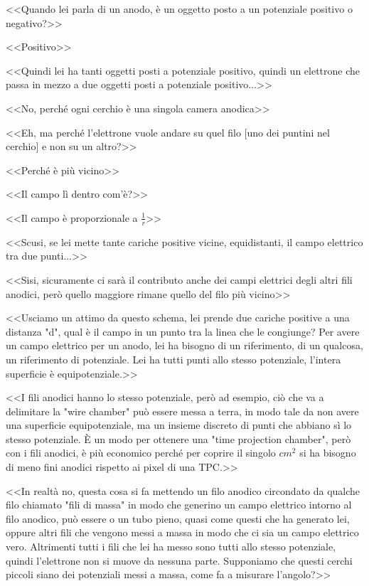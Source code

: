 \documentclass[../main.tex]{subfiles}
\begin{document}
\begin{enumerate}
{\begin{flushright}
    \end{flushright}
    <<Quando lei parla di un anodo, è un oggetto posto a un potenziale positivo o negativo?>>
    \begin{flushright}
    <<Positivo>>
    \end{flushright}
    <<Quindi lei ha tanti oggetti posti a potenziale positivo,  quindi un elettrone che passa in mezzo a due oggetti posti a potenziale positivo...>>
    \begin{flushright}
    <<No, perché ogni cerchio è una singola camera anodica>>
    \end{flushright}
    <<Eh, ma perché l'elettrone vuole andare su quel filo [uno dei puntini nel cerchio] e non su un altro?>>
    \begin{flushright}
    <<Perché è più vicino>>
    \end{flushright}
    <<Il campo lì dentro com'è?>>
    \begin{flushright}
    <<Il campo è proporzionale a $\frac{1}{r}$>>
    \end{flushright}
    <<Scusi, se lei mette tante cariche positive vicine, equidistanti, il campo elettrico tra due punti...>>
    \begin{flushright}
    <<Sisi, sicuramente ci sarà il contributo anche dei campi elettrici degli altri fili anodici, però quello maggiore rimane quello del filo più vicino>>
    \end{flushright}
    <<Usciamo un attimo da questo schema, lei prende due cariche positive a una distanza "d", qual è il campo in un punto tra la linea che le congiunge? Per avere un campo elettrico per un anodo, lei ha bisogno di un riferimento, di un qualcosa, un riferimento di potenziale. Lei ha tutti punti allo stesso potenziale, l'intera superficie è equipotenziale.>>
    \begin{flushright}
    <<I fili anodici hanno lo stesso potenziale, però ad esempio, ciò che va a delimitare la "wire chamber" può essere messa a terra, in modo tale da non avere una superficie equipotenziale, ma un insieme discreto di punti che abbiano sì lo stesso potenziale. È un modo per ottenere una "time projection chamber", però con i fili anodici, è più economico perché per coprire il singolo $cm^2$ si ha bisogno di meno fini anodici rispetto ai pixel di una TPC.>>
    \end{flushright}
    <<In realtà no, questa cosa si fa mettendo un filo anodico circondato da qualche filo chiamato "fili di massa" in modo che generino un campo elettrico intorno al filo anodico, può essere o un tubo pieno, quasi come questi che ha generato lei, oppure altri fili che vengono messi a massa in modo che ci sia un campo elettrico vero. Altrimenti tutti i fili che lei ha messo sono tutti allo stesso potenziale, quindi l'elettrone non si muove da nessuna parte. Supponiamo che questi cerchi piccoli siano dei potenziali messi a massa, come fa a misurare l'angolo?>>
}
\end{enumerate}
\end{document}
